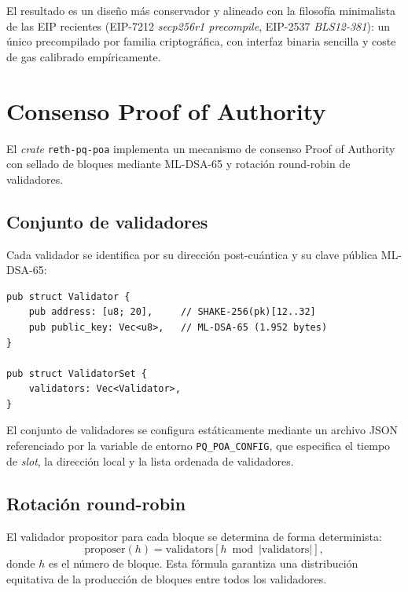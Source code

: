 El resultado es un diseño más conservador y alineado con la filosofía minimalista de las EIP recientes (EIP-7212 \emph{secp256r1 precompile}, EIP-2537 \emph{BLS12-381}): un único precompilado por familia criptográfica, con interfaz binaria sencilla y coste de gas calibrado empíricamente.


\section{Consenso Proof of Authority}
\label{sec:dev_poa}

El \emph{crate} \texttt{reth-pq-poa} implementa un mecanismo de consenso Proof of Authority con sellado de bloques mediante ML-DSA-65 y rotación round-robin de validadores.

\subsection{Conjunto de validadores}

Cada validador se identifica por su dirección post-cuántica y su clave pública ML-DSA-65:

\begin{lstlisting}[style=rustcode, caption={Estructura del conjunto de validadores.}, label={lst:validator_set}]
pub struct Validator {
    pub address: [u8; 20],     // SHAKE-256(pk)[12..32]
    pub public_key: Vec<u8>,   // ML-DSA-65 (1.952 bytes)
}

pub struct ValidatorSet {
    validators: Vec<Validator>,
}
\end{lstlisting}

El conjunto de validadores se configura estáticamente mediante un archivo JSON referenciado por la variable de entorno \texttt{PQ\_POA\_CONFIG}, que especifica el tiempo de \emph{slot}, la dirección local y la lista ordenada de validadores.

\subsection{Rotación round-robin}

El validador propositor para cada bloque se determina de forma determinista:
\begin{equation}
  \text{proposer}(h) = \text{validators}[h \bmod |\text{validators}|],
  \label{eq:round_robin}
\end{equation}
donde $h$ es el número de bloque. Esta fórmula garantiza una distribución equitativa de la producción de bloques entre todos los validadores.

